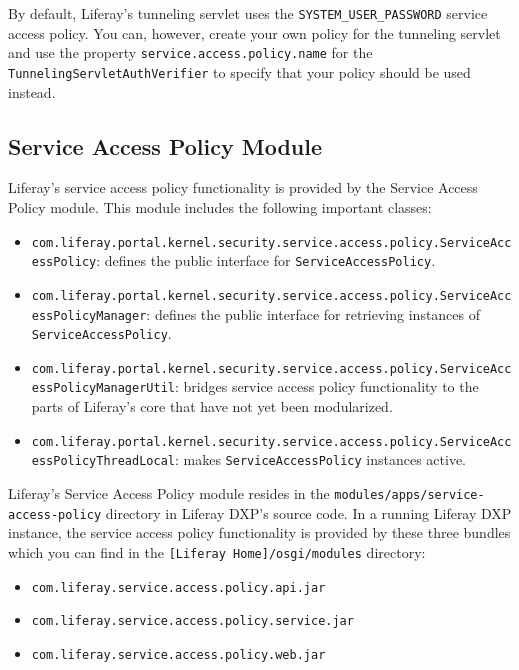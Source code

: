 By default, Liferay's tunneling servlet uses the
\texttt{SYSTEM\_USER\_PASSWORD} service access policy. You can, however,
create your own policy for the tunneling servlet and use the property
\texttt{service.access.policy.name} for the
\texttt{TunnelingServletAuthVerifier} to specify that your policy should
be used instead.

\subsection{Service Access Policy
Module}\label{service-access-policy-module}

Liferay's service access policy functionality is provided by the Service
Access Policy module. This module includes the following important
classes:

\begin{itemize}
\tightlist
\item
  \texttt{com.liferay.portal.kernel.security.service.access.policy.ServiceAccessPolicy}:
  defines the public interface for \texttt{ServiceAccessPolicy}.
\item
  \texttt{com.liferay.portal.kernel.security.service.access.policy.ServiceAccessPolicyManager}:
  defines the public interface for retrieving instances of
  \texttt{ServiceAccessPolicy}.
\item
  \texttt{com.liferay.portal.kernel.security.service.access.policy.ServiceAccessPolicyManagerUtil}:
  bridges service access policy functionality to the parts of Liferay's
  core that have not yet been modularized.
\item
  \texttt{com.liferay.portal.kernel.security.service.access.policy.ServiceAccessPolicyThreadLocal}:
  makes \texttt{ServiceAccessPolicy} instances active.
\end{itemize}

Liferay's Service Access Policy module resides in the
\texttt{modules/apps/service-access-policy} directory in Liferay DXP's
source code. In a running Liferay DXP instance, the service access
policy functionality is provided by these three bundles which you can
find in the \texttt{{[}Liferay\ Home{]}/osgi/modules} directory:

\begin{itemize}
\tightlist
\item
  \texttt{com.liferay.service.access.policy.api.jar}
\item
  \texttt{com.liferay.service.access.policy.service.jar}
\item
  \texttt{com.liferay.service.access.policy.web.jar}
\end{itemize}

